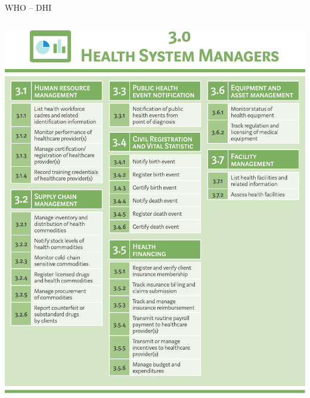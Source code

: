 \documentclass[aspectratio=1610,12pt]{beamer}
\begin{document}
\begin{frame}{WHO -- DHI}
\begin{columns}
  \includegraphics[height=.8\textheight]{img/whodhi-managers.pdf}
\end{columns}
\end{frame}
\end{document}
